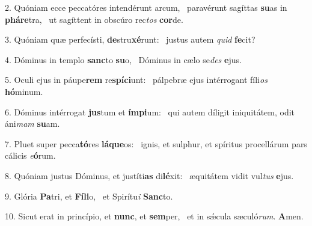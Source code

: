 2. Quóniam ecce peccatóres intendérunt arcum, \dag\  paravérunt sagíttas \textbf{su}as in \textbf{phá}\textbf{re}tra, \ast\  ut sagíttent in obscúro rec\textit{tos} \textbf{cor}de.\

3. Quóniam quæ perfecísti, \textbf{de}stru\textbf{xé}runt: \ast\  justus autem \textit{quid} \textbf{fe}cit?\

4. Dóminus in templo \textbf{sanc}to \textbf{su}o, \ast\  Dóminus in cælo se\textit{des} \textbf{e}jus.\

5. Oculi ejus in páupe\textbf{rem} re\textbf{spí}\textbf{ci}unt: \ast\  pálpebræ ejus intérrogant fíli\textit{os} \textbf{hó}minum.\

6. Dóminus intérrogat \textbf{jus}tum et \textbf{ím}\textbf{pi}um: \ast\  qui autem díligit iniquitátem, odit áni\textit{mam} \textbf{su}am.\

7. Pluet super pecca\textbf{tó}res \textbf{lá}\textbf{que}os: \ast\  ignis, et sulphur, et spíritus procellárum pars cálicis \textit{e}\textbf{ó}rum.\

8. Quóniam justus Dóminus, et justíti\textbf{as} di\textbf{lé}xit: \ast\  æquitátem vidit vul\textit{tus} \textbf{e}jus.\

9. Glória \textbf{Pa}tri, et \textbf{Fí}\textbf{li}o, \ast\  et Spirítu\textit{i} \textbf{Sanc}to.\

10. Sicut erat in princípio, et \textbf{nunc}, et \textbf{sem}per, \ast\  et in sǽcula sæculó\textit{rum}. \textbf{A}men.\

